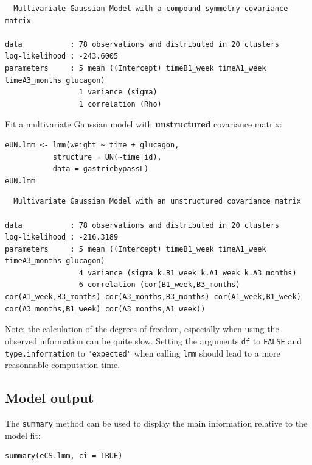 \documentclass[12pt]{article}
\begin{document}
\begin{verbatim}
  Multivariate Gaussian Model with a compound symmetry covariance matrix 
 
data           : 78 observations and distributed in 20 clusters 
log-likelihood : -243.6005
parameters     : 5 mean ((Intercept) timeB1_week timeA1_week timeA3_months glucagon) 
                 1 variance (sigma) 
                 1 correlation (Rho)
\end{verbatim}



\noindent Fit a multivariate Gaussian model with \textbf{unstructured} covariance matrix:
\lstset{language=r,label= ,caption= ,captionpos=b,numbers=none}
\begin{lstlisting}
eUN.lmm <- lmm(weight ~ time + glucagon,
	       structure = UN(~time|id),
	       data = gastricbypassL)
eUN.lmm
\end{lstlisting}

\begin{verbatim}
  Multivariate Gaussian Model with an unstructured covariance matrix 
 
data           : 78 observations and distributed in 20 clusters 
log-likelihood : -216.3189
parameters     : 5 mean ((Intercept) timeB1_week timeA1_week timeA3_months glucagon) 
                 4 variance (sigma k.B1_week k.A1_week k.A3_months) 
                 6 correlation (cor(B1_week,B3_months) cor(A1_week,B3_months) cor(A3_months,B3_months) cor(A1_week,B1_week) cor(A3_months,B1_week) cor(A3_months,A1_week))
\end{verbatim}


\uline{Note:} the calculation of the degrees of freedom, especially when
using the observed information can be quite slow. Setting the
arguments \texttt{df} to \texttt{FALSE} and \texttt{type.information} to \texttt{"expected"} when
calling \texttt{lmm} should lead to a more reasonnable computation time.

\clearpage

\subsection{Model output}
\label{sec:org24704eb}

The \texttt{summary} method can be used to display the main information
relative to the model fit:
\lstset{language=r,label= ,caption= ,captionpos=b,numbers=none}
\begin{lstlisting}
summary(eCS.lmm, ci = TRUE)
\end{lstlisting}
\end{document}
